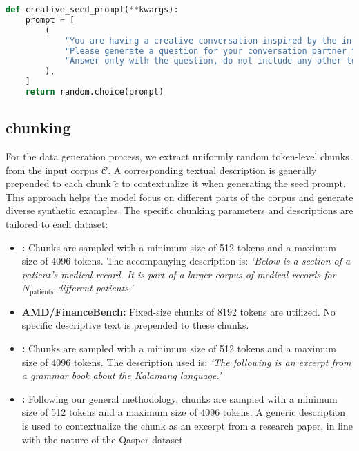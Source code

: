 \begin{exampleboxcode}
\begin{lstlisting}[language=Python]
def creative_seed_prompt(**kwargs):
    prompt = [
        (
            "You are having a creative conversation inspired by the information in the corpus. "
            "Please generate a question for your conversation partner to start off the discussion. "
            "Answer only with the question, do not include any other text."
        ),
    ]
    return random.choice(prompt)
\end{lstlisting}
\end{exampleboxcode}
\subsection{\method chunking}
For the \method data generation process, we extract uniformly random token-level chunks from the input corpus $\mathcal{C}$. A corresponding textual description is generally prepended to each chunk $\tilde{c}$ to contextualize it when generating the seed prompt. This approach helps the model focus on different parts of the corpus and generate diverse synthetic examples. The specific chunking parameters and descriptions are tailored to each dataset:
\begin{itemize}[leftmargin=*]
    \item \textbf{\longhealth:} Chunks are sampled with a minimum size of 512 tokens and a maximum size of 4096 tokens. The accompanying description is: \textit{`Below is a section of a patient's medical record. It is part of a larger corpus of medical records for $N_\text{patients}$ different patients.'}
    \item \textbf{AMD/FinanceBench:} Fixed-size chunks of 8192 tokens are utilized. No specific descriptive text is prepended to these chunks.
    \item \textbf{\mtob:} Chunks are sampled with a minimum size of 512 tokens and a maximum size of 4096 tokens. The description used is: \textit{`The following is an excerpt from a grammar book about the Kalamang language.'}
    \item \textbf{\qasper:} Following our general methodology, chunks are sampled with a minimum size of 512 tokens and a maximum size of 4096 tokens. A generic description is used to contextualize the chunk as an excerpt from a research paper, in line with the nature of the Qasper dataset.
\end{itemize}
\label{app:method-data-chunk}


